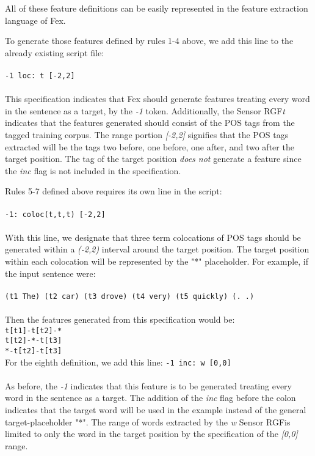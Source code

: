 \documentclass[11pt]{article}
\begin{document}
\noindent All of these feature definitions can be easily represented in the 
feature extraction language of Fex.  

To generate those features defined by rules 1-4 above, we add this line to the
already existing script file:\\\\
{\tt -1 loc: t [-2,2]}\\\\
This specification indicates that Fex should generate features treating every
word in the sentence as a target, by the {\em -1} token.  Additionally, the
Sensor RGF{\em t} indicates that the features generated should consist of
the POS tags from the tagged training corpus.  The range portion {\em [-2,2]}
signifies that the POS tags extracted will be the tags two before, one before,
one after, and two after the target position.  The tag of the target position
{\em does not} generate a feature since the {\em inc} flag is not included in 
the specification.

Rules 5-7 defined above requires its own line in the script:\\\\
{\tt -1: coloc(t,t,t) [-2,2]}\\\\
With this line, we designate that three term colocations of POS tags should be
generated within a {\em (-2,2)} interval around the target position.  The target
position within each colocation will be represented by the "*" placeholder.  For 
example, if the input sentence were: \\\\
{\tt (t1 The) (t2 car) (t3 drove) (t4 very) (t5 quickly) (. .)} \\\\
Then the features generated from this specification would be:\\
{\tt t[t1]-t[t2]-* \\
t[t2]-*-t[t3] \\
*-t[t2]-t[t3]} \\

For the eighth definition, we add this line:
{\tt -1 inc: w [0,0]} \\\\
As before, the {\em -1} indicates that this feature is to be generated treating
every word in the sentence as a target.  The addition of the {\em inc} flag
before the colon indicates that the target word will be used in the example 
instead of the general target-placeholder "*".  The range of words extracted 
by the {\em w} Sensor RGFis limited to only the word in the target 
position by the specification of the {\em [0,0]} range.
\end{document}

